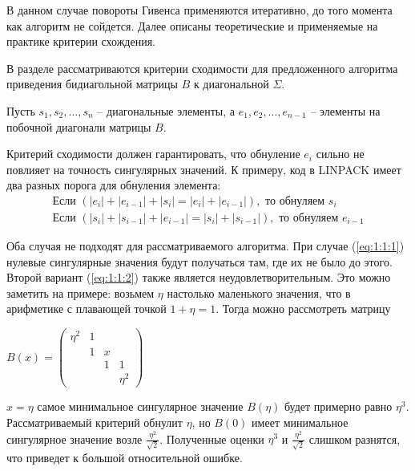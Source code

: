 В данном случае повороты Гивенса применяются итеративно, до того момента как алгоритм не сойдется. Далее описаны теоретические и применяемые на практике критерии схождения.


В разделе рассматриваются критерии сходимости для предложенного алгоритма приведения бидиагольной матрицы $B$ к диагональной $\Sigma$. 

Пусть $s_1, s_2,...,s_n$ \--- диагональные элементы, а $e_1, e_2, ..., e_{n-1}$ \--- элементы на побочной диагонали матрицы $B$. 

Критерий сходимости должен гарантировать, что обнуление $e_i$ сильно не повлияет на точность сингулярных значений. К примеру, код в LINPACK имеет два разных порога для обнуления элемента:
\begin{align}
\text{Если } (|e_i| + |e_{i-1}| + |s_i| = |e_i| + |e_{i-1}|), \text{ то обнуляем }s_i \label{eq:1:1:1}
\\\text{Если } (|s_i| + |s_{i-1}| + |e_{i-1}| = |s_i| + |s_{i-1}|), \text{ то обнуляем }e_{i-1} \label{eq:1:1:2}
\end{align}

Оба случая не подходят для рассматриваемого алгоритма. При случае (\ref{eq:1:1:1}) нулевые сингулярные значения будут получаться там, где их не было до этого. Второй вариант (\ref{eq:1:1:2})  также является неудовлетворительным. Это можно заметить на примере: возьмем $\eta$ настолько маленького значения, что в арифметике с плавающей точкой $1+\eta=1$. Тогда можно рассмотреть матрицу
\begin{center}
$B(x)=\begin{pmatrix}
    \eta^2&1&&\\
    &1&x\\
    &&1&1\\
    &&&\eta^2
\end{pmatrix}$
\end{center}

 $x=\eta$ самое минимальное сингулярное значение $B(\eta)$ будет примерно равно $\eta^3$. Рассматриваемый критерий обнулит $\eta$, но $B(0)$ имеет минимальное сингулярное значение возле $\frac{\eta^2}{\sqrt{2}}$. Полученные оценки $\eta^3$ и $\frac{\eta^2}{\sqrt{2}}$ слишком разнятся, что приведет к большой относительной ошибке.

